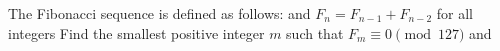 The Fibonacci sequence is defined as follows:   and $F_n=F_{n-1}+F_{n-2}$ for all integers  Find the smallest positive integer $m$ such that $F_m\equiv 0 \pmod {127}$ and 